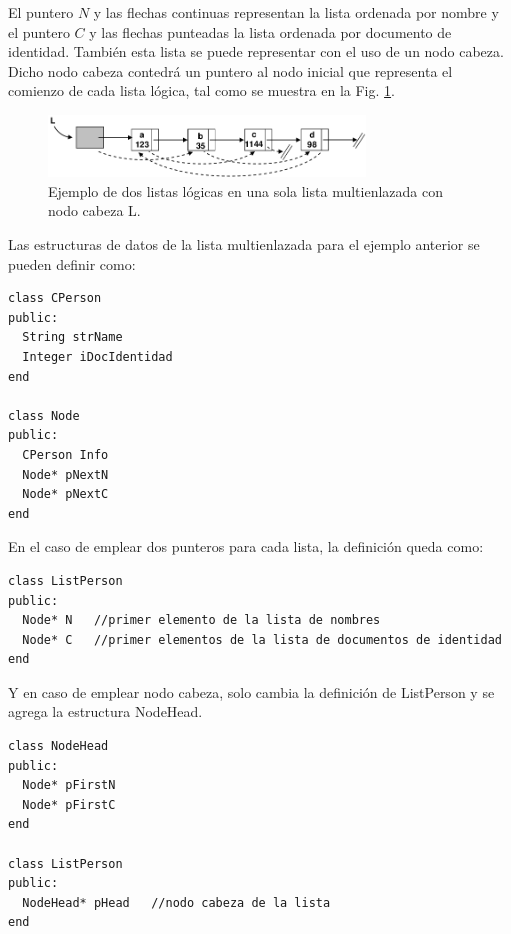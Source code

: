  El puntero $N$ y las flechas continuas representan la lista ordenada por nombre y el puntero $C$ y las flechas punteadas la lista ordenada por documento de identidad. También esta lista se puede representar con el uso de un nodo cabeza. Dicho nodo cabeza contedrá un puntero al nodo inicial que representa el comienzo de cada lista lógica, tal como se muestra en la Fig. \ref{fig:multisecond}.

\begin{figure}[htp!]
  \begin{center}
    \includegraphics[width=0.75\textwidth]{images/second.png}
  \end{center}
  \caption{Ejemplo de dos listas lógicas en una sola lista multienlazada con nodo cabeza L.}
  \label{fig:multisecond}
\end{figure}


Las estructuras de datos de la lista multienlazada para el ejemplo anterior se pueden definir como:

\begin{lstlisting}[upquote=true, language=pseudo]
class CPerson
public:
  String strName
  Integer iDocIdentidad
end

class Node
public:
  CPerson Info
  Node* pNextN
  Node* pNextC
end
\end{lstlisting}

En el caso de emplear dos punteros para cada lista, la definición queda como:

\begin{lstlisting}[upquote=true, language=pseudo]
class ListPerson
public:
  Node* N	//primer elemento de la lista de nombres
  Node* C	//primer elementos de la lista de documentos de identidad
end
\end{lstlisting}

Y en caso de emplear nodo cabeza, solo cambia la definición de ListPerson y se agrega la estructura NodeHead.

\begin{lstlisting}[upquote=true, language=pseudo]
class NodeHead
public:
  Node* pFirstN
  Node* pFirstC
end

class ListPerson
public:
  NodeHead* pHead	//nodo cabeza de la lista
end
\end{lstlisting}

